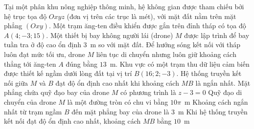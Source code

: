	\begin{ex}
		Tại một phân khu nông nghiệp thông minh, hệ không gian được tham chiếu bởi hệ trục tọa độ $Oxyz$ (đơn vị trên các trục là mét), với mặt đất nằm trên mặt phẳng $(Oxy)$. Một trạm ăng-ten điều khiển được gắn trên đỉnh tháp có tọa độ $A(4;-3;15)$. Một thiết bị bay không người lái (drone) $M$ được lập trình để bay tuần tra ở độ cao ổn định $3$~m so với mặt đất. Để hướng sóng kết nối với tháp luôn đạt mức tối ưu, drone $M$ liên tục di chuyển nhưng luôn giữ khoảng cách thẳng tới ăng-ten $A$ đúng bằng $13$~m. Khu vực có một trạm thu dữ liệu cảm biến được thiết kế ngầm dưới lòng đất tại vị trí $B(16;2;-3)$. Hệ thống truyền kết nối giữa $M$ và $B$ đạt độ ổn định cao nhất khi khoảng cách $MB$ là ngắn nhất.
		\choiceTFt
		{\True Mặt phẳng chứa quỹ đạo bay của drone $M$ có phương trình là $z-3=0$}
		{\True Quỹ đạo di chuyển của drone $M$ là một đường tròn có chu vi bằng $10\pi$~m}
		{Khoảng cách ngắn nhất từ trạm ngầm $B$ đến mặt phẳng bay của drone là $3$~m}
		{\True Khi hệ thống truyền kết nối đạt độ ổn định cao nhất, khoảng cách $MB$ bằng $10$~m}
\end{ex}
